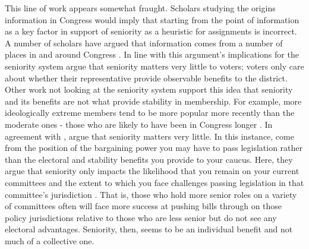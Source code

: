 \documentclass [12pt]{article}
\begin{document}
This line of work appears somewhat fraught. Scholars studying the origins information in Congress would imply that starting from the point of information as a key factor in support of seniority as a heuristic for assignments is incorrect. A number of scholars have argued that information comes from a number of places in and around Congress \cite{Austen-Smith1993,Hall2006,McCrain2018}. In line with this argument's implications for the seniority system  argue that seniority matters very little to voters; voters only care about whether their representative provide observable benefits to the district. Other work not looking at the seniority system support this idea that seniority and its benefits are not what provide stability in membership. For example, more ideologically extreme members tend to be more popular more recently than the moderate ones - those who are likely to have been in Congress longer \cite{Utych2019}. In agreement with ,  argue that seniority matters very little. In this instance,  come from the position of the bargaining power you may have to pass legislation rather than the electoral and stability benefits you provide to your caucus. Here, they argue that seniority only impacts the likelihood that you remain on your current committees and the extent to which you face challenges passing legislation in that committee's jurisdiction \cite{Kellermann2009}. That is, those who hold more senior roles on a variety of committees often will face more success at pushing bills through on those policy jurisdictions relative to those who are less senior but do not see any electoral advantages. Seniority, then, seems to be an individual benefit and not much of a collective one.
\end{document}
